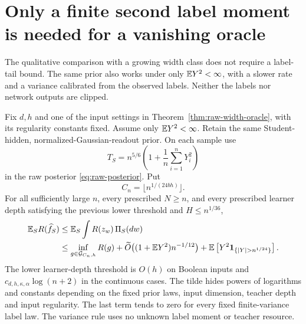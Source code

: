 \section{Only a finite second label moment is needed for a vanishing oracle}
\label{sec:raw-finite-variance}
The qualitative comparison with a growing width class does not require a
label-tail bound.  The same prior also works under only $\mathbb E Y^2<\infty$,
with a slower rate and a variance calibrated from the observed labels.
Neither the labels nor network outputs are clipped.

\begin{theorem}
\label{thm:raw-finite-variance-width}
Fix $d,h$ and one of the input settings in
Theorem~\ref{thm:raw-width-oracle}, with its regularity constants fixed.
Assume only $\mathbb E Y^2<\infty$.  Retain the same Student-hidden,
normalized-Gaussian-readout prior.  On each sample use
\[
 T_S=n^{5/6}\left(1+\frac1n\sum_{i=1}^nY_i^2\right)
\]
in the raw posterior \eqref{eq:raw-posterior}.  Put
\[
 C_n=\lfloor n^{1/(24bh)}\rfloor.
\]
For all sufficiently large $n$, every prescribed $N\ge n$, and every
prescribed learner depth satisfying the previous lower threshold and
$H\le n^{1/36}$,
\begin{align}
 \E_S R(\widehat f_S)
 &\le\E_S\int R(z_w)\,\Pi_S(dw)\notag\\
 &\le\inf_{g\in\mathcal G_{C_n,h}}R(g)
   +\widetilde O\big((1+\E Y^2)n^{-1/12}\big)
   +\E\left[Y^2\mathbf1_{\{|Y|>n^{1/24}\}}\right].
 \label{eq:finite-variance-growing-raw}
\end{align}
The lower learner-depth threshold is $O(h)$ on Boolean inputs and
$c_{d,h,\kappa,\alpha}\log(n+2)$ in the continuous cases.
The tilde hides powers of logarithms and constants depending on the fixed
prior laws, input dimension, teacher depth and input regularity.
The last term tends to zero for every fixed finite-variance label law.
The variance rule uses no unknown label moment or teacher resource.
\end{theorem}
